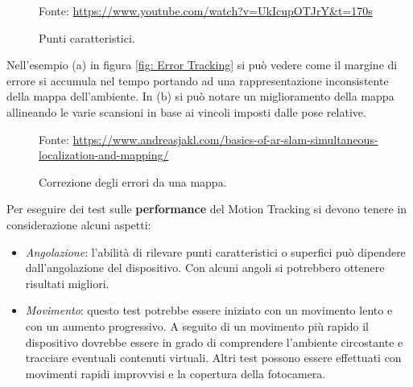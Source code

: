 \documentclass[crop=false, class=book]{standalone}
\begin{document}
		\begin{figure}
			\centering
			{Fonte: \url{https://www.youtube.com/watch?v=UkIcupOTJrY&t=170s}}
			\caption{Punti caratteristici.}
			\label{fig: Punti caratteristici}
		\end{figure}
		
		\noindent
		Nell'esempio (a) in figura \vref{fig: Error Tracking} si può vedere come il margine di errore si accumula nel tempo portando ad una rappresentazione inconsistente della mappa dell'ambiente. In (b) si può notare un miglioramento della mappa allineando le varie scansioni in base ai vincoli imposti dalle pose relative. 
			
		\begin{figure}
			\centering
			{Fonte: \url{https://www.andreasjakl.com/basics-of-ar-slam-simultaneous-localization-and-mapping/}}
			\caption{Correzione degli errori da una mappa.}
			\label{fig: Error Tracking}
		\end{figure}
		
		\begin{flushleft}
			Per eseguire dei test sulle \textbf{performance} del Motion Tracking si devono tenere in considerazione alcuni aspetti:
		\end{flushleft}
		
		\begin{itemize}
			\item \emph{Angolazione}: l'abilità di rilevare punti caratteristici o superfici può dipendere dall'angolazione del dispositivo. Con alcuni angoli si potrebbero ottenere risultati migliori.
			\item \emph{Movimento}: questo test potrebbe essere iniziato con un movimento lento e con un aumento progressivo. A seguito di un movimento più rapido il dispositivo dovrebbe essere in grado di comprendere l'ambiente circostante e tracciare eventuali contenuti virtuali. Altri test possono essere effettuati con movimenti rapidi improvvisi e la copertura della fotocamera.
		\end{itemize}
		
		
		
		
		
	
\end{document}
